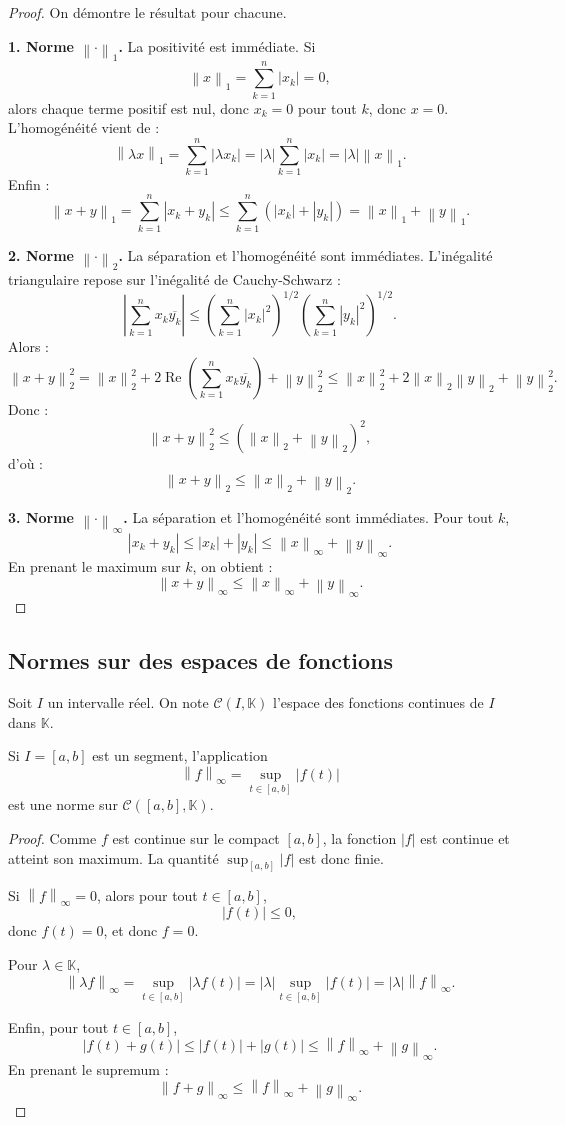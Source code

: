 \documentclass[11pt,a4paper]{article}
\newcommand{\K}{\mathbb K}
\newcommand{\norme}[1]{\left\lVert #1 \right\rVert}
\begin{document}
\begin{proof}
On démontre le résultat pour chacune.

\textbf{1. Norme \(\norme{\cdot}_1\).}  
La positivité est immédiate. Si
\[
\norme{x}_1=\sum_{k=1}^n |x_k|=0,
\]
alors chaque terme positif est nul, donc \(x_k=0\) pour tout \(k\), donc \(x=0\).  
L'homogénéité vient de :
\[
\norme{\lambda x}_1=\sum_{k=1}^n |\lambda x_k|
=|\lambda|\sum_{k=1}^n |x_k|
=|\lambda|\norme{x}_1.
\]
Enfin :
\[
\norme{x+y}_1
=\sum_{k=1}^n |x_k+y_k|
\leq \sum_{k=1}^n (|x_k|+|y_k|)
=\norme{x}_1+\norme{y}_1.
\]

\textbf{2. Norme \(\norme{\cdot}_2\).}  
La séparation et l'homogénéité sont immédiates. L'inégalité triangulaire repose sur l'inégalité de Cauchy-Schwarz :
\[
\left|\sum_{k=1}^n x_k\overline{y_k}\right|
\leq
\left(\sum_{k=1}^n |x_k|^2\right)^{1/2}
\left(\sum_{k=1}^n |y_k|^2\right)^{1/2}.
\]
Alors :
\[
\norme{x+y}_2^2
=
\norme{x}_2^2+2\operatorname{Re}\left(\sum_{k=1}^n x_k\overline{y_k}\right)+\norme{y}_2^2
\leq
\norme{x}_2^2+2\norme{x}_2\norme{y}_2+\norme{y}_2^2.
\]
Donc :
\[
\norme{x+y}_2^2\leq (\norme{x}_2+\norme{y}_2)^2,
\]
d'où :
\[
\norme{x+y}_2\leq \norme{x}_2+\norme{y}_2.
\]

\textbf{3. Norme \(\norme{\cdot}_\infty\).}  
La séparation et l'homogénéité sont immédiates. Pour tout \(k\),
\[
|x_k+y_k|\leq |x_k|+|y_k|
\leq \norme{x}_\infty+\norme{y}_\infty.
\]
En prenant le maximum sur \(k\), on obtient :
\[
\norme{x+y}_\infty\leq \norme{x}_\infty+\norme{y}_\infty.
\]
\end{proof}

\subsection{Normes sur des espaces de fonctions}

Soit \(I\) un intervalle réel. On note \(\mathcal C(I,\K)\) l'espace des fonctions continues de \(I\) dans \(\K\).

\begin{theorembox}
Si \(I=[a,b]\) est un segment, l'application
\[
\norme{f}_\infty=\sup_{t\in[a,b]}|f(t)|
\]
est une norme sur \(\mathcal C([a,b],\K)\).
\end{theorembox}

\begin{proof}
Comme \(f\) est continue sur le compact \([a,b]\), la fonction \(|f|\) est continue et atteint son maximum. La quantité \(\sup_{[a,b]}|f|\) est donc finie.

Si \(\norme{f}_\infty=0\), alors pour tout \(t\in[a,b]\),
\[
|f(t)|\leq 0,
\]
donc \(f(t)=0\), et donc \(f=0\).

Pour \(\lambda\in\K\),
\[
\norme{\lambda f}_\infty
=\sup_{t\in[a,b]}|\lambda f(t)|
=|\lambda|\sup_{t\in[a,b]}|f(t)|
=|\lambda|\norme{f}_\infty.
\]

Enfin, pour tout \(t\in[a,b]\),
\[
|f(t)+g(t)|\leq |f(t)|+|g(t)|
\leq \norme{f}_\infty+\norme{g}_\infty.
\]
En prenant le supremum :
\[
\norme{f+g}_\infty\leq \norme{f}_\infty+\norme{g}_\infty.
\]
\end{proof}
\end{document}
